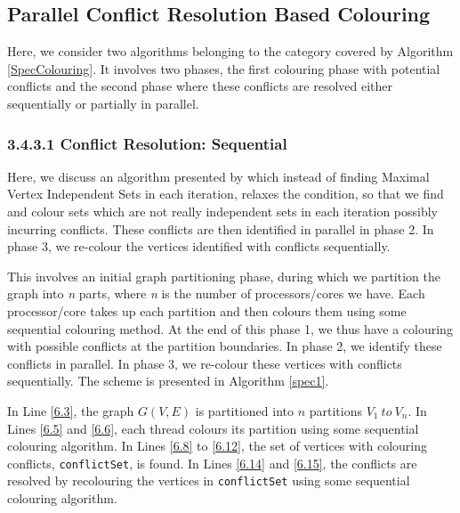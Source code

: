 \documentclass[MTech]{iitmdiss}
\begin{document}
\subsection{Parallel Conflict Resolution Based Colouring}
Here, we consider two algorithms belonging to the category covered by Algorithm \ref{SpecColouring}. It involves two phases, the first colouring phase with potential conflicts and the second phase where these conflicts are resolved either sequentially or partially in parallel.
\subsubsection{3.4.3.1 \: \: Conflict Resolution: Sequential}
Here, we discuss an algorithm presented by \citet{CPE:CPE528} which instead of finding Maximal Vertex Independent Sets in each iteration, relaxes the condition, so that we find and colour sets which are not really independent sets in each iteration possibly incurring conflicts. These conflicts are then identified in parallel in phase 2. In phase 3, we re-colour the vertices identified with conflicts sequentially.

This involves an initial graph partitioning phase, during which we partition the graph into \textit{n} parts, where \textit{n} is the number of processors/cores we have. Each processor/core takes up each partition and then colours them using some sequential colouring method. At the end of this phase 1, we thus have a colouring with possible conflicts at the partition boundaries. In phase 2, we identify these conflicts in parallel. In phase 3, we re-colour these vertices with conflicts sequentially. The scheme is presented in Algorithm \ref{spec1}.

In Line \ref{6.3}, the graph $G(V,E)$ is partitioned into $n$ partitions $V_{1} \: to \: V_{n}$. In Lines \ref{6.5} and \ref{6.6}, each thread colours its partition using some sequential colouring algorithm. In Lines \ref{6.8} to \ref{6.12}, the set of vertices with colouring conflicts, \verb+conflictSet+, is found. In Lines \ref{6.14} and \ref{6.15}, the conflicts are resolved by recolouring the vertices in \verb+conflictSet+ using some sequential colouring algorithm.
\end{document}
